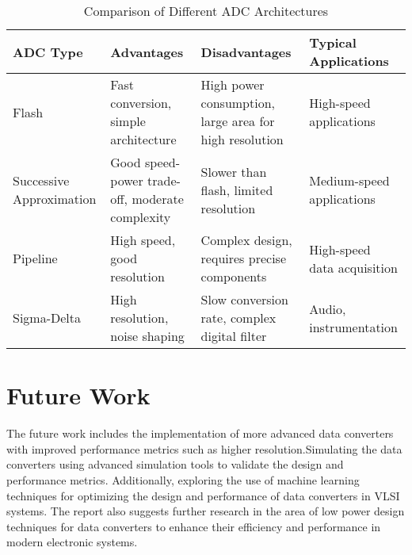 \begin{table}[h!]
\centering
\begin{tabular}{|p{2.8cm}|p{3.5cm}|p{3.8cm}|p{3.2cm}|}
\hline
\textbf{ADC Type} & \textbf{Advantages} & \textbf{Disadvantages} & \textbf{Typical Applications} \\
\hline
Flash & Fast conversion, simple architecture & High power consumption, large area for high resolution & High-speed applications \\
\hline
Successive Approximation & Good speed-power trade-off, moderate complexity & Slower than flash, limited resolution & Medium-speed applications \\
\hline
Pipeline & High speed, good resolution & Complex design, requires precise components & High-speed data acquisition \\
\hline
Sigma-Delta & High resolution, noise shaping & Slow conversion rate, complex digital filter & Audio, instrumentation \\
\hline
\end{tabular}
\caption{Comparison of Different ADC Architectures}
\label{tab:adc_comparison}
\end{table}

\section{Future Work}
The future work includes the implementation of more advanced data converters with improved performance metrics such as higher resolution.Simulating the data converters using advanced simulation tools to validate the design and performance metrics. Additionally, exploring the use of machine learning techniques for optimizing the design and performance of data converters in VLSI systems. The report also suggests further research in the area of low power design techniques for data converters to enhance their efficiency and performance in modern electronic systems.


\nocite{bookpll}
\nocite{vandeplassche2003cmos}
\nocite{vandeplassche1988eightbit}
\nocite{abrial1988analog}
\nocite{schouwenaars1988lowpower}
\nocite{jin2014energyefficient}
\nocite{vandeplassche1982monolithic}